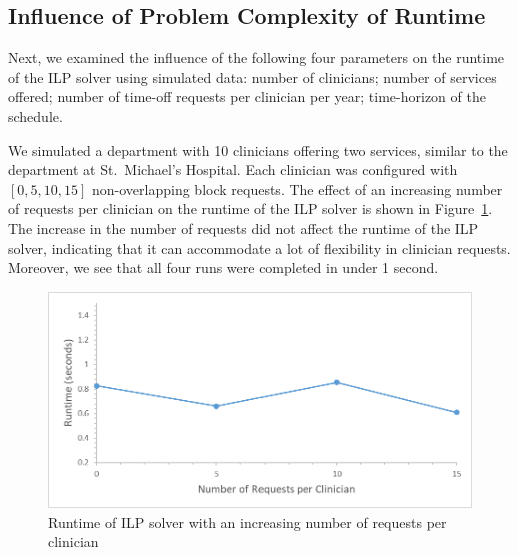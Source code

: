 

\subsection{Influence of Problem Complexity of Runtime}
Next, we examined the influence of the following four parameters on the
runtime of the ILP solver using simulated data:
number of clinicians;
number of services offered;
number of time-off requests per clinician per year;
time-horizon of the schedule.

We simulated a department with 10 clinicians offering two services, similar to the
department at St.\ Michael's Hospital. Each clinician was
configured with $[0, 5, 10, 15]$ non-overlapping block
requests.
The effect of an increasing number of requests per clinician on the runtime of
the ILP solver is shown in Figure~\ref{fig:runtime-requests}.
The increase in the number of requests did not affect the runtime of
the ILP solver, indicating that it can accommodate a lot of flexibility in
clinician requests. Moreover, we see that all four runs were completed in under
1 second.

\begin{figure}[h]
	\centering
	\includegraphics[scale=.5]{fig/runtime_requests} %
	\caption{Runtime of ILP solver with an increasing number of requests per clinician}
  \label{fig:runtime-requests}
\end{figure}

